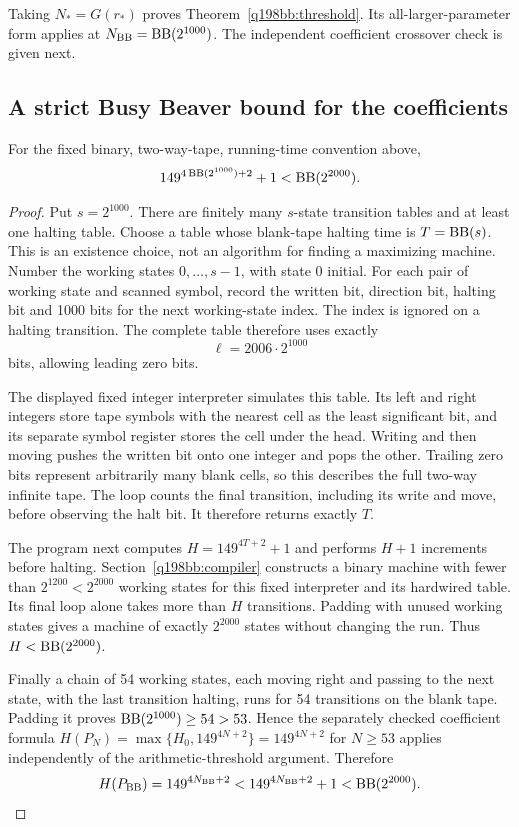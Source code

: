 Taking $N_*=G(r_*)$ proves Theorem~\ref{q198bb:threshold}.
Its all-larger-parameter form applies at $N_{\rm BB}=\operatorname{BB}(2^{1000})$.
The independent coefficient crossover check is given next.


\subsection{A strict Busy Beaver bound for the coefficients}
\begin{lemma}\label{q198bb:coefficient}
For the fixed binary, two-way-tape, running-time convention above,
\[
 149^{4\operatorname{BB}(2^{1000})+2}+1<\operatorname{BB}(2^{2000}).
\]
\end{lemma}
\begin{proof}
Put $s=2^{1000}$. There are finitely many $s$-state transition
tables and at least one halting table. Choose a table whose
blank-tape halting time is $T=\operatorname{BB}(s)$. This is an existence
choice, not an algorithm for finding a maximizing machine.
Number the working states $0,\ldots,s-1$, with state 0 initial.
For each pair of working state and scanned symbol, record the
written bit, direction bit, halting bit and 1000 bits for the next
working-state index. The index is ignored on a halting transition.
The complete table therefore uses exactly
\[
                        \ell=2006\cdot2^{1000}
\]
bits, allowing leading zero bits.

The displayed fixed integer interpreter simulates this table.
Its left and right integers store tape symbols with the nearest
cell as the least significant bit, and its separate symbol
register stores the cell under the head. Writing and then moving
pushes the written bit onto one integer and pops the other.
Trailing zero bits represent arbitrarily many blank cells, so
this describes the full two-way infinite tape. The loop counts
the final transition, including its write and move, before
observing the halt bit. It therefore returns exactly $T$.

The program next computes $H=149^{4T+2}+1$ and performs $H+1$
increments before halting. Section~\ref{q198bb:compiler} constructs
a binary machine with fewer than $2^{1200}<2^{2000}$ working
states for this fixed interpreter and its hardwired table.
Its final loop alone takes more than $H$ transitions. Padding
with unused working states gives a machine of exactly
$2^{2000}$ states without changing the run. Thus
$H<\operatorname{BB}(2^{2000})$.

Finally a chain of 54 working states, each moving right and
passing to the next state, with the last transition halting,
runs for 54 transitions on the blank tape. Padding it proves
$\operatorname{BB}(2^{1000})\ge54>53$. Hence the separately checked coefficient
formula $H(P_N)=\max\{H_0,149^{4N+2}\}=149^{4N+2}$ for $N\ge53$
applies independently of the arithmetic-threshold argument. Therefore
\[
 H(P_{\rm BB})=149^{4N_{\rm BB}+2}
 <149^{4N_{\rm BB}+2}+1<\operatorname{BB}(2^{2000}).
\]
\end{proof}


